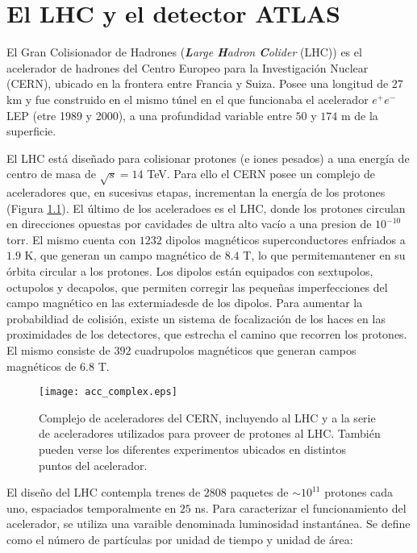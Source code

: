 \chapter{El LHC y el detector ATLAS}


El Gran Colisionador de Hadrones (\textit{\textbf{L}arge \textbf{H}adron \textbf{C}olider} (LHC)) \cite{Evans:1129806} es el acelerador de hadrones del Centro Europeo para la Investigación Nuclear (CERN), ubicado en la frontera entre Francia y Suiza. Posee una longitud de 27 km y fue construido en el mismo túnel en el que funcionaba el acelerador $e^{+}e^{-}$ LEP (etre 1989 y 2000), a una profundidad variable entre $50$ y $174$ m de la superficie.

El LHC está diseñado para colisionar protones (e iones pesados) a una energía de centro de masa de $\sqrt{s}=14$ TeV. Para ello el CERN posee un complejo de aceleradores que, en sucesivas etapas, incrementan la energía de los protones (Figura \ref{acc_complex}). El último de los aceleradoes es el LHC, donde los protones circulan en direcciones opuestas por cavidades de ultra alto vacío a una presion de $10^{-10}$ torr. El mismo cuenta con $1232$ dipolos magnéticos superconductores enfriados a $1.9$ K, que generan un campo magnético de $8.4$ T, lo que permitemantener en su órbita circular a los protones. Los dipolos están equipados con sextupolos, octupolos y decapolos, que permiten corregir las pequeñas imperfecciones del campo magnético en las extermiadesde de los dipolos. Para aumentar la probabildiad de colisión, existe un sistema de focalización de los haces en las proximidades de los detectores, que estrecha el camino que recorren los protones. El mismo consiste de $392$ cuadrupolos magnéticos que generan campos magnéticos de $6.8$ T. 

\begin{figure}[ht]
\centering
\texttt{[image: acc\_complex.eps]}
\caption{Complejo de aceleradores del CERN, incluyendo al LHC y a la serie de aceleradores utilizados para proveer de protones al LHC. También pueden verse los diferentes experimentos ubicados en distintos puntos del acelerador.}
\label{acc_complex}
\end{figure}

El diseño del LHC contempla trenes de $2808$ paquetes de $\sim 10^{11}$ protones cada uno, espaciados temporalmente en $25$ ns. Para caracterizar el funcionamiento del acelerador, se utiliza una varaible denominada luminosidad instantánea. Se define como el número de partículas por unidad de tiempo y unidad de área:

